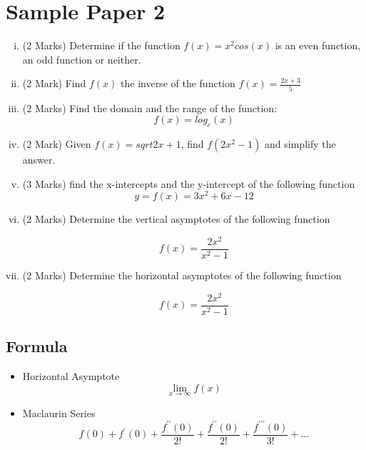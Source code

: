 \documentclass[]{article}
\begin{document}
\section*{Sample Paper 2}
\begin{enumerate}[(i)]
	\item (2 Marks) Determine if the function $f(x) = x^2cos(x)$ is an even function, an odd function or neither.
	
	\item (2 Mark)  Find $f(x)$ the inverse of the function
	$f(x) =  \frac{2x + 3}{5}$
	
		
		\item (2 Marks) Find the domain and the range of the function:
		\[f(x) = log_e(x)\]
		

	
	\item (2 Mark) Given $f(x) = sqrt{2x+1}$, find $f(2x^2-1)$ and simplify the answer.
	
	
	
	

	
 \item (3 Marks) find the x-intercepts and the y-intercept of the following function
 \[ y = f(x) = 3x^2 +6x - 12\]
	

\item (2 Marks) Determine the vertical asymptotes of the following function

\[  f(x)  = \frac{2x^2}{x^2 - 1} \]

\item (2 Marks) Determine the horizontal asymptotes of the following function

\[  f(x)  = \frac{2x^2}{x^2 - 1} \]	
	
\end{enumerate}
\newpage
\subsection*{Formula}

\begin{itemize}
\item Horizontal Asymptote
\[ \lim_{x \to \infty } f(x) \]
	\item Maclaurin Series
\[f(0) + f^{\prime}(0) + \frac{f^{\prime \prime}(0)}{2!} + \frac{f^{\prime \prime}(0)}{2!} + \frac{f^{\prime\prime \prime}(0)}{3!} + \ldots \]
\end{itemize}
\end{document}
